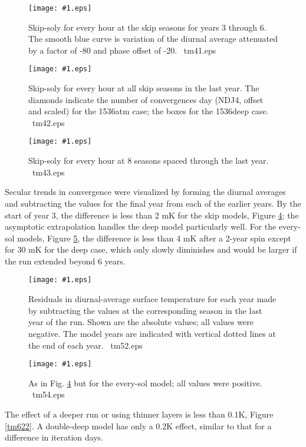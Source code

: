 \documentclass{article}  %
\newcommand{\igc}[1]{\texttt{[image: \#1.eps]}}  %
\begin{document}
\begin{figure}[!ht] \igc{img/tm41}
\caption[Skip-soly]{Skip-soly for every hour at the skip seasons for years 3
  through 6.  The smooth blue curve is variation of the diurnal average
  attenuated by a factor of -80 and phase offset of -20\qd.
  \ tm41.eps \label{tm41} } \end{figure}

\begin{figure}[!ht] \igc{img/tm42}
\caption[Skip-soly last year]{Skip-soly for every hour at all skip seasons in
  the last year.  The diamonds indicate the number of convergences day (NDJ4,
  offset and scaled) for the 1536atm case; the boxes for the 1536deep
  case. \ tm42.eps \label{tm42} } \end{figure}

\begin{figure}[!ht] \igc{img/tm43}
\caption[Skip-soly spaced seasons]{Skip-soly for every hour at 8 seasons spaced
  through the last year.  \ tm43.eps \label{tm43} } \end{figure}

Secular trends in convergence were visualized by forming the diurnal averages
and subtracting the values for the final year from each of the earlier years.
By the start of year 3, the difference is less than 2 mK for the skip models,
Figure \ref{tm52}; the asymptotic extrapolation handles the deep model
particularly well. For the every-sol models, Figure \ref{tm54}, the difference
is less than 4 mK after a 2-year spin except for 30 mK for the deep case, which
only slowly diminishes and would be larger if the run extended beyond 6 years.

\begin{figure}[!ht] \igc{img/tm52}
\caption[Skip secular]{Residuals in diurnal-average surface temperature for each
  year made by subtracting the values at the corresponding season in the last
  year of the run. Shown are the absolute values; all values were negative. The
  model years are indicated with vertical dotted lines at the end of each
  year. \ tm52.eps \label{tm52} } \end{figure}

\begin{figure}[!ht] \igc{img/tm54}
\caption[Soly secular]{As in Fig. \ref{tm52} but for the every-sol model; all
  values were positive.  \ tm54.eps \label{tm54} } \end{figure}

The effect of a deeper run or using thinner layers is less than 0.1K, Figure
\ref {tm622}. A double-deep model has only a 0.2K effect, similar to that for a
difference in iteration days.
 
\end{document}
